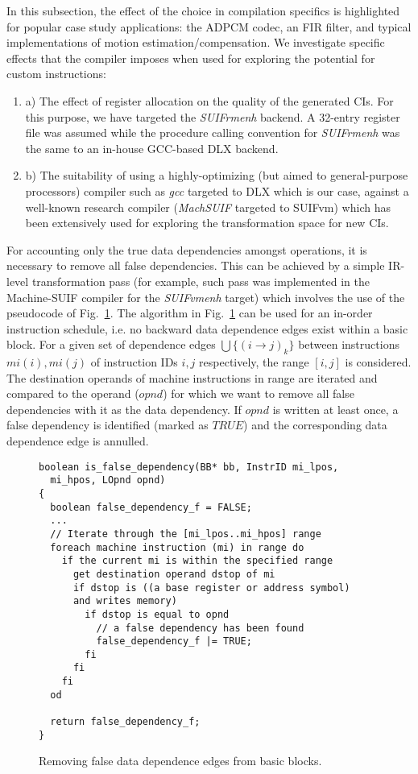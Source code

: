 \documentclass{comjnl}
\begin{document}
In this subsection, the effect of the choice in compilation specifics is highlighted for popular case study applications: the ADPCM codec, an FIR filter, and typical implementations of motion estimation/compensation. We investigate specific effects that the compiler imposes when used for exploring the potential for custom instructions:
\begin {enumerate}
\item[a)] {The effect of register allocation on the quality of the generated CIs. For this purpose, we have targeted the {\it SUIFrmenh} backend. A 32-entry register file was assumed while the procedure calling convention for {\it SUIFrmenh} was the same to an in-house GCC-based DLX backend.}
\item[b)]	{The suitability of using a highly-optimizing (but aimed to general-purpose processors) compiler such as {\it gcc} targeted to DLX which is our case, against a well-known research compiler ({\it MachSUIF} targeted to SUIFvm) which has been extensively used for exploring the transformation space for new CIs.}
\end{enumerate}

For accounting only the true data dependencies amongst operations, it is necessary to remove all false dependencies. This can be achieved by a simple IR-level transformation pass (for example, such pass was implemented in the Machine-SUIF compiler for the {\it SUIFvmenh} target) which involves the use of the pseudocode of Fig.~\ref{Fig:4}. The algorithm in Fig.~\ref{Fig:4} can be used for an in-order instruction schedule, i.e. no backward data dependence edges exist within a basic block. For a given set of dependence edges $\bigcup\{(i \rightarrow j)_k\}$ between instructions $mi(i),mi(j)$ of instruction IDs $i,j$ respectively, the range $[i,j]$ is considered. The destination operands of machine instructions in range are iterated and compared to the operand ($opnd$) for which we want to remove all false dependencies with it as the data dependency. If $opnd$ is written at least once, a false dependency is identified (marked as $TRUE$) and the corresponding data dependence edge is annulled.

\begin{figure}[tb]
\centering
{
{\footnotesize
\begin{verbatim}
boolean is_false_dependency(BB* bb, InstrID mi_lpos, 
  mi_hpos, LOpnd opnd)
{
  boolean false_dependency_f = FALSE;
  ...
  // Iterate through the [mi_lpos..mi_hpos] range
  foreach machine instruction (mi) in range do     
    if the current mi is within the specified range
      get destination operand dstop of mi      
      if dstop is ((a base register or address symbol) 
      and writes memory)
        if dstop is equal to opnd
          // a false dependency has been found
          false_dependency_f |= TRUE;
        fi
      fi
    fi
  od
  
  return false_dependency_f;
}
\end{verbatim}
}
}
\vspace{-0.125cm}
\caption{Removing false data dependence edges from basic blocks.}
\label{Fig:4}
\end{figure}
\end{document}
